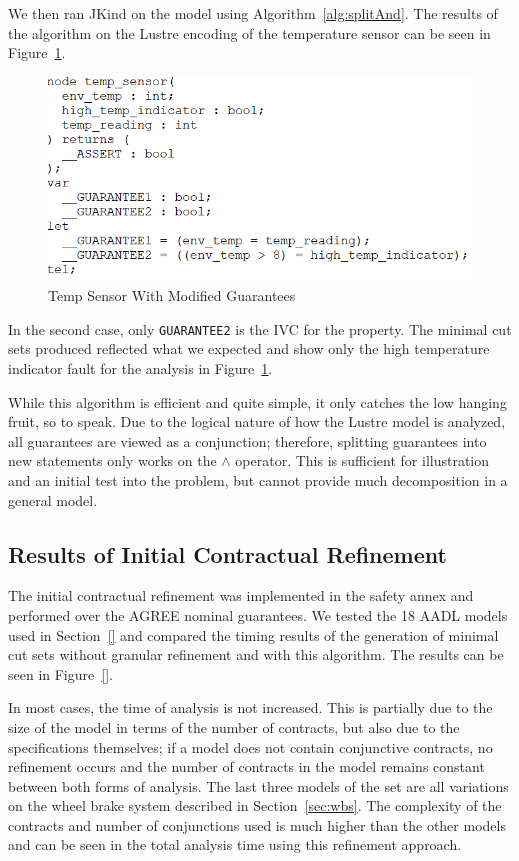We then ran JKind on the model using Algorithm~\ref{alg:splitAnd}. The results of the algorithm on the Lustre encoding of the temperature sensor can be seen in Figure~\ref{fig:lustreTwoGuar}. 

\begin{figure}[h!]
\begin{center}
\includegraphics[width=.8\textwidth]{images/lustreOneGuar.PNG}
\caption{Temp Sensor With Modified Guarantees} \label{fig:lustreTwoGuar}
\end{center}
\end{figure} 

 In the second case, only \texttt{GUARANTEE2} is the IVC for the property. The minimal cut sets produced reflected what we expected and show only the high temperature indicator fault for the analysis in Figure~\ref{fig:lustreTwoGuar}. 

While this algorithm is efficient and quite simple, it only catches the low hanging fruit, so to speak. Due to the logical nature of how the Lustre model is analyzed, all guarantees are viewed as a conjunction; therefore, splitting guarantees into new statements only works on the $\land$ operator. This is sufficient for illustration and an initial test into the problem, but cannot provide much decomposition in a general model. 

\subsection{Results of Initial Contractual Refinement}
\label{sec:resultsAND}
The initial contractual refinement was implemented in the safety annex and performed over the AGREE nominal guarantees. We tested the 18 AADL models used in Section~\ref{} and compared the timing results of the generation of minimal cut sets without granular refinement and with this algorithm. The results can be seen in Figure~\ref{}. 

In most cases, the time of analysis is not increased. This is partially due to the size of the model in terms of the number of contracts, but also due to the specifications themselves; if a model does not contain conjunctive contracts, no refinement occurs and the number of contracts in the model remains constant between both forms of analysis. The last three models of the set are all variations on the wheel brake system described in Section~\ref{sec:wbs}. The complexity of the contracts and number of conjunctions used is much higher than the other models and can be seen in the total analysis time using this refinement approach. 